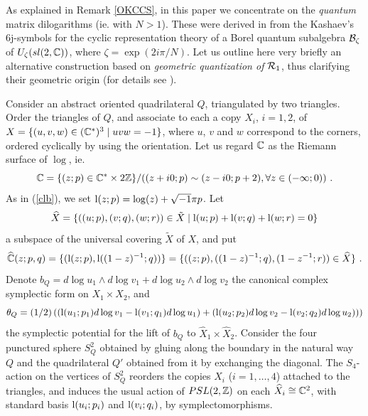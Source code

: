   As
explained in Remark \ref{OKCCS}, in this paper we concentrate on the
{\it quantum} matrix dilogarithms (ie.  with $N>1$). These were
derived in \cite{BB2} from the Kashaev's 6j-symbols for the cyclic
representation theory of a Borel quantum subalgebra ${\mathcal B}_\zeta$ of
$U_\zeta(sl(2,\mathbb{C}))$, where $\zeta=\exp(2i\pi/N)$. Let us outline here
very briefly an alternative construction based on {\it geometric
quantization of ${\mathcal R}_1$}, thus clarifying their geometric origin (for
details see \cite{B}).
\smallskip

Consider an abstract oriented quadrilateral $Q$, triangulated by two
triangles.  Order the triangles of $Q$, and associate to each a copy
$X_i$, $i=1,2$, of $X=\{(u,v,w)\in(\mathbb{C}^*)^3\mid uvw=-1\}$, where $u$,
$v$ and $w$ correspond to the corners, ordered cyclically by using the
orientation. Let us regard $\mathbb{C}$ as the Riemann surface of $\log$,
ie. 
$$\mathbb{C}=\{(z;p) \in \mathbb{C}^*\times 2\mathbb{Z} \}/((z+i0;p)\sim (z-i0;p+2),
\forall z\in (-\infty;0)) \ . $$ As in (\ref{clb}), we set ${\rm
l}(z;p)= \log(z)+\sqrt{-1}\pi p $.  Let
$$\widehat{X}=\{((u;p),(v;q),(w;r)) \in \tilde{X}\mid {\rm l}(u;p)+{\rm
l}(v;q)+{\rm l}(w;r)=0\}$$ a subspace of the universal covering
$\tilde{X}$ of $X$, and put
$$\widehat{\mathbb{C}}(z;p,q)=\{({\rm l}(z;p),{\rm
l}((1-z)^{-1};q))\}=\{((z;p),((1-z)^{-1};q),(1-z^{-1};r))\in
\widehat{X}\} \ . $$ Denote $b_Q=d\log u_1 \wedge d\log v_1 + d\log
u_2 \wedge d\log v_2$ the canonical complex symplectic form on
$X_1\times X_2$, and
$$\theta_Q=(1/2)\left(({\rm l}(u_1;p_1)d\log v_1 - {\rm
  l}(v_1;q_1)d\log u_1) + ({\rm l}(u_2;p_2)d\log v_2 - {\rm
  l}(v_2;q_2)d\log u_2))\right)$$
the symplectic potential for the lift of $b_Q$ to $\widehat{X}_1
\times \widehat{X}_2$. Consider the four punctured sphere $S_Q^2$
obtained by gluing along the boundary in the natural way $Q$ and the
quadrilateral $Q'$ obtained from it by exchanging the diagonal. The
$S_4$-action on the vertices of $S_Q^2$ reorders the copies $X_i$
($i=1,\ldots,4$) attached to the triangles, and induces the usual action
of $PSL(2,\mathbb{Z})$ on each $\widehat{X}_i\cong \mathbb{C}^2$, with standard
basis ${\rm l}(u_i;p_i)$ and ${\rm l}(v_i;q_i)$, by
symplectomorphisms. 
